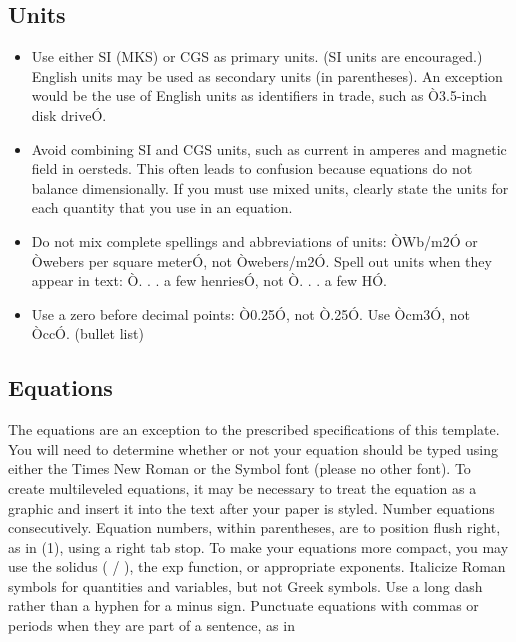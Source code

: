 \documentclass[letterpaper, 10 pt, conference]{ieeeconf}  %
\begin{document}
                                        \subsection{Units}

                                        \begin{itemize}

                                            \item Use either SI (MKS) or CGS as primary units. (SI units are encouraged.) English units may be used as secondary units (in parentheses). An exception would be the use of English units as identifiers in trade, such as Ò3.5-inch disk driveÓ.
                                            \item Avoid combining SI and CGS units, such as current in amperes and magnetic field in oersteds. This often leads to confusion because equations do not balance dimensionally. If you must use mixed units, clearly state the units for each quantity that you use in an equation.
                                            \item Do not mix complete spellings and abbreviations of units: ÒWb/m2Ó or Òwebers per square meterÓ, not Òwebers/m2Ó.  Spell out units when they appear in text: Ò. . . a few henriesÓ, not Ò. . . a few HÓ.
                                            \item Use a zero before decimal points: Ò0.25Ó, not Ò.25Ó. Use Òcm3Ó, not ÒccÓ. (bullet list)

                                        \end{itemize}


                                        \subsection{Equations}

                                        The equations are an exception to the prescribed specifications of this template. You will need to determine whether or not your equation should be typed using either the Times New Roman or the Symbol font (please no other font). To create multileveled equations, it may be necessary to treat the equation as a graphic and insert it into the text after your paper is styled. Number equations consecutively. Equation numbers, within parentheses, are to position flush right, as in (1), using a right tab stop. To make your equations more compact, you may use the solidus ( / ), the exp function, or appropriate exponents. Italicize Roman symbols for quantities and variables, but not Greek symbols. Use a long dash rather than a hyphen for a minus sign. Punctuate equations with commas or periods when they are part of a sentence, as in
\end{document}
